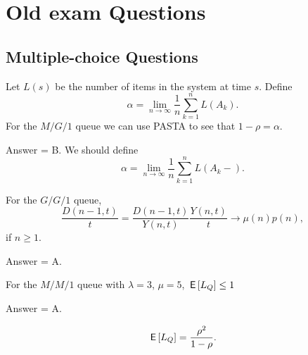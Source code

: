 \section{Old exam Questions}

\subsection{Multiple-choice Questions}

\begin{exercise}[201703]
Let $L(s)$ be the number of items in the system at time $s$. 
Define 
\begin{equation*}
\alpha = \lim_{n\to\infty} \frac 1 n \sum_{k=1}^n L(A_k).
\end{equation*}
For the $M/G/1$ queue we can use PASTA to see that $1-\rho = \alpha$.

\begin{solution} Answer = B.
We should define
\begin{equation*}
\alpha = \lim_{n\to\infty} \frac 1 n \sum_{k=1}^n L(A_k-).
\end{equation*}
\end{solution}
\end{exercise}

\begin{exercise}[201703]
For the $G/G/1$ queue,
\begin{equation}
 \frac{D(n-1,t)}t = \frac{D(n-1,t)}{Y(n,t)}\frac{Y(n,t)}t \to \mu(n) p(n),
\end{equation}
if $n\geq 1$.

\begin{solution}
 Answer = A.
\end{solution}
\end{exercise}

\begin{exercise}[201703]
 For the $M/M/1$ queue with $\lambda=3$, $\mu=5$, $\,\mathsf{E}\left[L_Q\right] \leq 1$

\begin{solution}
 Answer = A.

 \begin{equation*}
\,\mathsf{E}\left[L_Q\right] = \frac{\rho^2}{1-\rho}.
 \end{equation*}
\end{solution}
\end{exercise}

